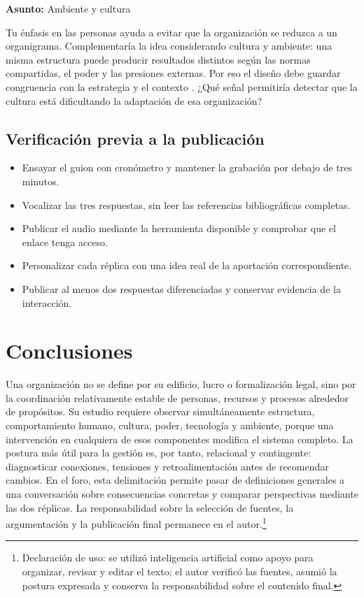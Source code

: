 \documentclass[spanish,letterpaper,oneside]{article}
\begin{document}
\begin{forobox}[title={Segunda retroalimentación para adaptar y publicar}]
\textbf{Asunto:} Ambiente y cultura\par
\medskip
Tu énfasis en las personas ayuda a evitar que la organización se reduzca a un organigrama. Complementaría la idea considerando cultura y ambiente: una misma estructura puede producir resultados distintos según las normas compartidas, el poder y las presiones externas. Por eso el diseño debe guardar congruencia con la estrategia y el contexto \citep{openstaxEnvironment2019,openstaxStructures2019}. ¿Qué señal permitiría detectar que la cultura está dificultando la adaptación de esa organización?
\end{forobox}

\subsection{Verificación previa a la publicación}

\begin{itemize}
  \item Ensayar el guion con cronómetro y mantener la grabación por debajo de tres minutos.
  \item Vocalizar las tres respuestas, sin leer las referencias bibliográficas completas.
  \item Publicar el audio mediante la herramienta disponible y comprobar que el enlace tenga acceso.
  \item Personalizar cada réplica con una idea real de la aportación correspondiente.
  \item Publicar al menos dos respuestas diferenciadas y conservar evidencia de la interacción.
\end{itemize}

\clearpage
\section{Conclusiones}

Una organización no se define por su edificio, lucro o formalización legal, sino por la coordinación relativamente estable de personas, recursos y procesos alrededor de propósitos. Su estudio requiere observar simultáneamente estructura, comportamiento humano, cultura, poder, tecnología y ambiente, porque una intervención en cualquiera de esos componentes modifica el sistema completo. La postura más útil para la gestión es, por tanto, relacional y contingente: diagnosticar conexiones, tensiones y retroalimentación antes de recomendar cambios. En el foro, esta delimitación permite pasar de definiciones generales a una conversación sobre consecuencias concretas y comparar perspectivas mediante las dos réplicas. La responsabilidad sobre la selección de fuentes, la argumentación y la publicación final permanece en el autor.\footnote{Declaración de uso: se utilizó inteligencia artificial como apoyo para organizar, revisar y editar el texto; el autor verificó las fuentes, asumió la postura expresada y conserva la responsabilidad sobre el contenido final.}

\clearpage

\end{document}
